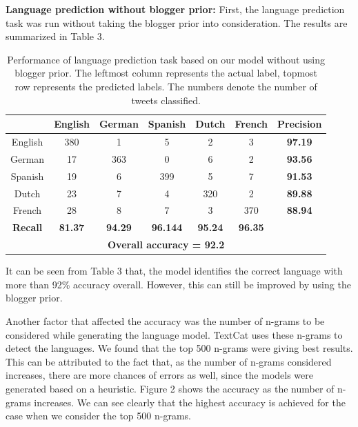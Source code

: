 \documentclass[11pt]{article}
\begin{document}
{\textbf {Language prediction without blogger prior: }}  First, the language prediction task was run without taking the blogger prior into consideration. The results are summarized in Table 3.


\begin{table}
\begin{center}
\small
\begin{tabular}{|c|c|c|c|c|c|c|}
\hline
\textbf{} & \textbf{English} & \textbf {German} & \textbf{Spanish} & \textbf{Dutch} & \textbf{French} & \textbf{Precision} \\
\hline
English    &        380       &       1          &        5         &       2        &        3        &      \textbf{97.19} \\
German      &         17       &     363          &        0         &       6        &        2        &      \textbf{93.56} \\
Spanish    &         19       &       6          &      399         &       5        &        7        &      \textbf{91.53} \\
Dutch      &         23       &       7          &        4         &     320        &        2        &      \textbf{89.88} \\
French     &         28       &       8          &        7         &       3        &      370        &      \textbf{88.94} \\
\hline
\textbf{Recall}&\textbf{81.37}& \textbf{94.29}   & \textbf{96.144}  & \textbf{95.24} & \textbf{96.35}  &      \textbf{} \\
\hline
\multicolumn{7}{|c|}{\textbf{Overall accuracy = 92.2}} \\\hline
\end{tabular}
\caption{\footnotesize Performance of language prediction task based on our model without using blogger prior. The leftmost column represents the actual label, topmost row represents the predicted labels. The numbers denote the number of tweets classified.}
\end{center}
\end{table}

It can be seen from Table 3 that, the model identifies the correct language with more than 92\% accuracy overall. However, this can still be improved by using the blogger prior.

Another factor that affected the accuracy was the number of n-grams to be considered while generating the language model. TextCat uses these n-grams to detect the languages. We found that the top 500 n-grams were giving best results. This can be attributed to the fact that, as the number of n-grams considered increases, there are more chances of errors as well, since the models were generated based on a heuristic. Figure 2 shows the accuracy as the number of n-grams increases. We can see clearly that the highest accuracy is achieved for the case when we consider the top 500 n-grams.
\end{document}
